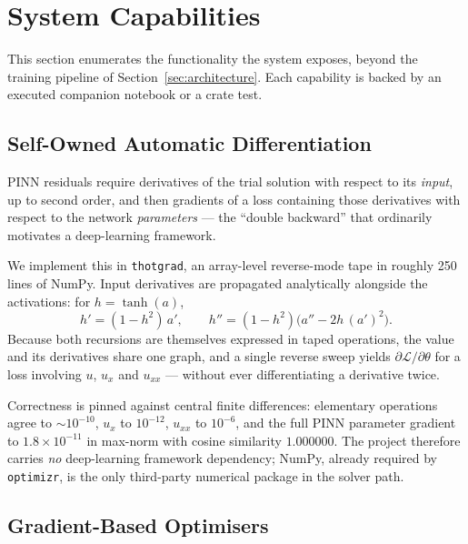 \documentclass[11pt,a4paper]{article}
\theoremstyle{plain}
\theoremstyle{definition}
\begin{document}
\section{System Capabilities}
\label{sec:capabilities}

This section enumerates the functionality the system exposes, beyond the
training pipeline of Section~\ref{sec:architecture}. Each capability is
backed by an executed companion notebook or a crate test.

\subsection{Self-Owned Automatic Differentiation}

PINN residuals require derivatives of the trial solution with respect to its
\emph{input}, up to second order, and then gradients of a loss containing
those derivatives with respect to the network \emph{parameters} --- the
``double backward'' that ordinarily motivates a deep-learning framework.

We implement this in \texttt{thotgrad}, an array-level reverse-mode tape in
roughly 250 lines of NumPy. Input derivatives are propagated analytically
alongside the activations: for $h=\tanh(a)$,
\begin{equation}
h' = (1-h^{2})\,a', \qquad
h'' = (1-h^{2})\bigl(a'' - 2h\,(a')^{2}\bigr).
\label{eq:tanhderiv}
\end{equation}
Because both recursions are themselves expressed in taped operations, the
value and its derivatives share one graph, and a single reverse sweep yields
$\partial\mathcal{L}/\partial\theta$ for a loss involving $u$, $u_x$ and
$u_{xx}$ --- without ever differentiating a derivative twice.

Correctness is pinned against central finite differences: elementary
operations agree to $\sim$$10^{-10}$, $u_x$ to $10^{-12}$, $u_{xx}$ to
$10^{-6}$, and the full PINN parameter gradient to $1.8\times10^{-11}$ in
max-norm with cosine similarity $1.000000$. The project therefore carries
\emph{no} deep-learning framework dependency; NumPy, already required by
\texttt{optimizr}, is the only third-party numerical package in the solver
path.

\subsection{Gradient-Based Optimisers}
\end{document}
